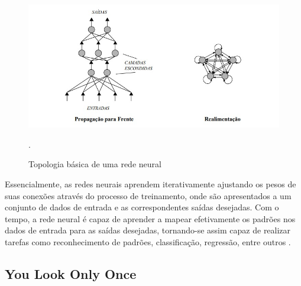 \begin{figure}[!h]
    \centering
    \begin{minipage}{0.9\linewidth}
    \centering
    \captionsetup{justification=centering,margin=0.5cm,font=small}
    \includegraphics[width=0.7\linewidth]{img/cap2/topologia-rede.jpeg}
    \caption{Topologia básica de uma rede neural \cite{fleck2016redes}}.
    \label{fig:topologia}
    \end{minipage}
\end{figure}

Essencialmente, as redes neurais aprendem iterativamente ajustando os pesos de suas conexões através do processo de treinamento, onde são apresentados a um conjunto de dados de entrada e as correspondentes saídas desejadas. Com o tempo, a rede neural é capaz de aprender a mapear efetivamente os padrões nos dados de entrada para as saídas desejadas, tornando-se assim capaz de realizar tarefas como reconhecimento de padrões, classificação, regressão, entre outros .


\subsection{You Look Only Once}
\label{sec:yolo}

